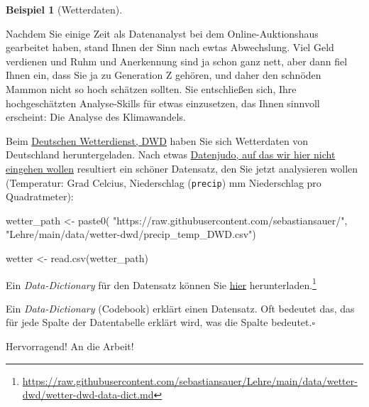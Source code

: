 \documentclass[
  a4paper,
]{scrbook}
\newenvironment{Shaded}{\begin{snugshade}}{\end{snugshade}}
\newcommand{\FunctionTok}[1]{\textcolor[rgb]{0.28,0.35,0.67}{#1}}
\newcommand{\NormalTok}[1]{\textcolor[rgb]{0.00,0.23,0.31}{#1}}
\newcommand{\OtherTok}[1]{\textcolor[rgb]{0.00,0.23,0.31}{#1}}
\newcommand{\StringTok}[1]{\textcolor[rgb]{0.13,0.47,0.30}{#1}}
\theoremstyle{definition}
\newtheorem{example}{Beispiel}[chapter]
\theoremstyle{definition}
\theoremstyle{definition}
\theoremstyle{remark}
\begin{document}
\begin{example}[Wetterdaten]\protect\hypertarget{exm-wetterdaten}{}\label{exm-wetterdaten}

Nachdem Sie einige Zeit als Datenanalyst bei dem Online-Auktionshaus
gearbeitet haben, stand Ihnen der Sinn nach ewtas Abwechslung. Viel Geld
verdienen und Ruhm und Anerkennung sind ja schon ganz nett, aber dann
fiel Ihnen ein, dass Sie ja zu Generation Z gehören, und daher den
schnöden Mammon nicht so hoch schätzen sollten. Sie entschließen sich,
Ihre hochgeschätzten Analyse-Skills für etwas einzusetzen, das Ihnen
sinnvoll erscheint: Die Analyse des Klimawandels.

Beim \href{https://www.dwd.de/DE/Home/home_node.html}{Deutschen
Wetterdienst, DWD} haben Sie sich Wetterdaten von Deutschland
heruntergeladen. Nach etwas
\href{https://data-se.netlify.app/2022/07/24/preparing-german-weather-data/}{Datenjudo,
auf das wir hier nicht eingehen wollen} resultiert ein schöner
Datensatz, den Sie jetzt analysieren wollen (Temperatur: Grad Celcius,
Niederschlag (\texttt{precip}) mm Niederschlag pro Quadratmeter):

\begin{Shaded}
\begin{Highlighting}[]
\NormalTok{wetter\_path }\OtherTok{\textless{}{-}} \FunctionTok{paste0}\NormalTok{(}
  \StringTok{"https://raw.githubusercontent.com/sebastiansauer/"}\NormalTok{,}
  \StringTok{"Lehre/main/data/wetter{-}dwd/precip\_temp\_DWD.csv"}\NormalTok{)}

\NormalTok{wetter }\OtherTok{\textless{}{-}} \FunctionTok{read.csv}\NormalTok{(wetter\_path)}
\end{Highlighting}
\end{Shaded}

Ein \emph{Data-Dictionary} für den Datensatz können Sie
\href{https://raw.githubusercontent.com/sebastiansauer/Lehre/main/data/wetter-dwd/wetter-dwd-data-dict.md}{hier}
herunterladen.\footnote{\url{https://raw.githubusercontent.com/sebastiansauer/Lehre/main/data/wetter-dwd/wetter-dwd-data-dict.md}}

\begin{tcolorbox}[enhanced jigsaw, colbacktitle=quarto-callout-note-color!10!white, bottomrule=.15mm, left=2mm, breakable, rightrule=.15mm, coltitle=black, title=\textcolor{quarto-callout-note-color}{\faInfo}\hspace{0.5em}{Hinweis}, colback=white, leftrule=.75mm, titlerule=0mm, opacityback=0, bottomtitle=1mm, toprule=.15mm, arc=.35mm, toptitle=1mm, opacitybacktitle=0.6, colframe=quarto-callout-note-color-frame]

Ein \emph{Data-Dictionary} (Codebook) erklärt einen Datensatz. Oft
bedeutet das, das für jede Spalte der Datentabelle erklärt wird, was die
Spalte bedeutet.\(\square\)

\end{tcolorbox}

Hervorragend! An die Arbeit!

\end{example}
\end{document}
